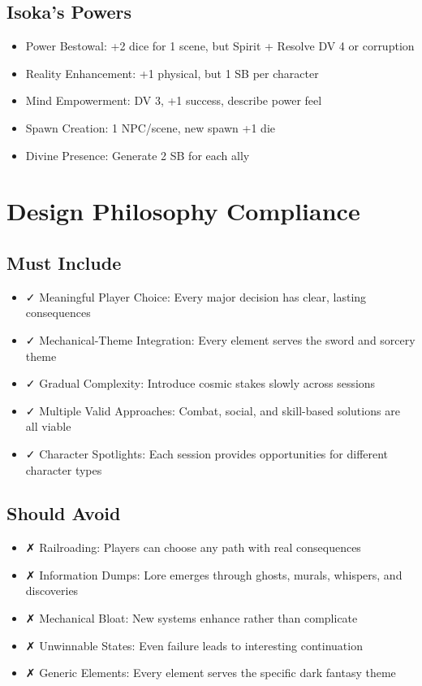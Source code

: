 \documentclass[11pt]{article}
\begin{document}
\subsection*{Isoka's Powers}
\begin{itemize}
    \item Power Bestowal: +2 dice for 1 scene, but Spirit + Resolve DV 4 or corruption
    \item Reality Enhancement: +1 physical, but 1 SB per character
    \item Mind Empowerment: DV 3, +1 success, describe power feel
    \item Spawn Creation: 1 NPC/scene, new spawn +1 die
    \item Divine Presence: Generate 2 SB for each ally
\end{itemize}

\section*{Design Philosophy Compliance}

\subsection*{Must Include}
\begin{itemize}
    \item ✓ Meaningful Player Choice: Every major decision has clear, lasting consequences
    \item ✓ Mechanical-Theme Integration: Every element serves the sword and sorcery theme
    \item ✓ Gradual Complexity: Introduce cosmic stakes slowly across sessions
    \item ✓ Multiple Valid Approaches: Combat, social, and skill-based solutions are all viable
    \item ✓ Character Spotlights: Each session provides opportunities for different character types
\end{itemize}

\subsection*{Should Avoid}
\begin{itemize}
    \item ✗ Railroading: Players can choose any path with real consequences
    \item ✗ Information Dumps: Lore emerges through ghosts, murals, whispers, and discoveries
    \item ✗ Mechanical Bloat: New systems enhance rather than complicate
    \item ✗ Unwinnable States: Even failure leads to interesting continuation
    \item ✗ Generic Elements: Every element serves the specific dark fantasy theme
\end{itemize}
\end{document}
